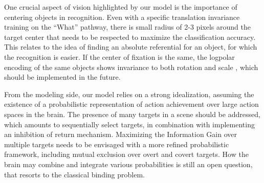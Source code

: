 


One crucial aspect of vision highlighted by our model is the importance of centering objects in recognition. Even with a specific translation invariance training on the ``What'' pathway, there is small radius of 2-3 pixels around the target center that needs to be respected to maximize the classification accuracy. This relates to the idea of finding an absolute referential for an object, for which the recognition is easier. If the center of fixation is the same, the logpolar encoding of the same objects shows invariance to both rotation and scale \citep{Traver10}, which should be implemented in the future.


From the modeling side, our model relies on a strong idealization, assuming the existence of a probabilistic representation of action achievement over large action spaces in the brain. 
The presence of many targets in a scene should be addressed, which amounts to sequentially select targets, in combination with implementing an inhibition of return mechanism. Maximizing the Information Gain over multiple targets needs to be envisaged with a more refined probabilistic framework, including mutual exclusion over overt and covert targets.
How the brain may combine and integrate various probabilities is still an open question, that resorts to the classical binding problem. %
